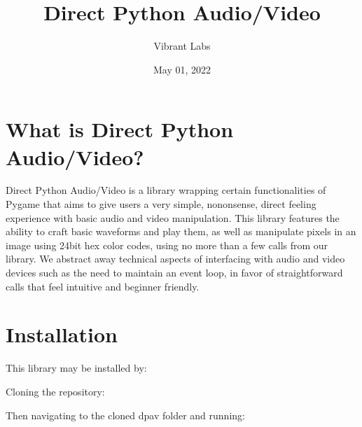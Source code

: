 \documentclass[letterpaper,10pt,english]{sphinxmanual}
\title{Direct Python Audio/Video}
\date{May 01, 2022}
\author{Vibrant Labs}
\begin{document}
\pagestyle{empty}
\sphinxmaketitle
\pagestyle{plain}
\sphinxtableofcontents
\pagestyle{normal}
\label{\detokenize{index::doc}}



\chapter{What is Direct Python Audio/Video?}
\label{\detokenize{fundamentals:what-is-direct-python-audio-video}}\label{\detokenize{fundamentals::doc}}
\sphinxAtStartPar
Direct Python Audio/Video is a library wrapping certain functionalities of Pygame that aims to give users a very simple, no\sphinxhyphen{}nonsense, direct feeling experience with basic audio and video manipulation. This library features the ability to craft basic waveforms and play them, as well as manipulate pixels in an image using 24\sphinxhyphen{}bit hex color codes, using no more than a few calls from our library. We abstract away technical aspects of interfacing with audio and video devices such as the need to maintain an event loop, in favor of straightforward calls that feel intuitive and beginner friendly.


\chapter{Installation}
\label{\detokenize{fundamentals:installation}}
\sphinxAtStartPar
This library may be installed by:

\sphinxAtStartPar
Cloning the repository:

\begin{sphinxVerbatim}[commandchars=\\\{\}]
  
\end{sphinxVerbatim}

\sphinxAtStartPar
Then navigating to the cloned dpav folder and running:

\begin{sphinxVerbatim}[commandchars=\\\{\}]
  
\end{sphinxVerbatim}
\end{document}
